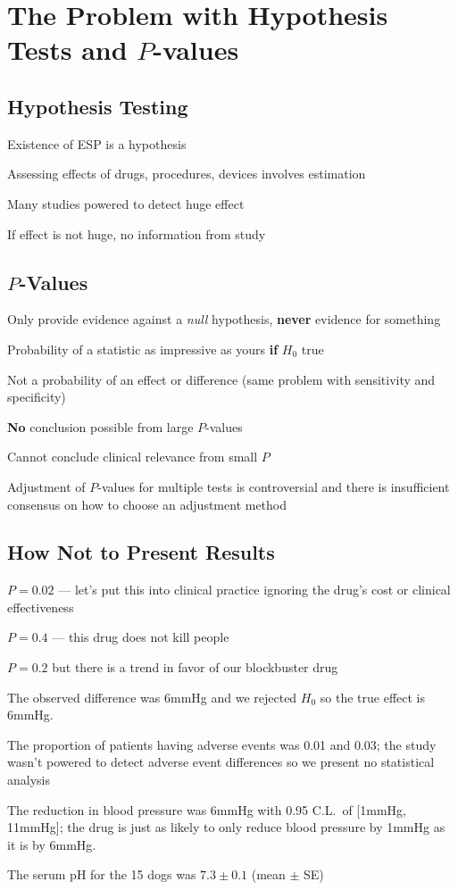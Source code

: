 \section{The Problem with Hypothesis Tests and $P$-values}
\subsection{Hypothesis Testing}
\bi
\item Existence of ESP is a hypothesis
\item Assessing effects of drugs, procedures, devices involves
  estimation
\item Many studies powered to detect huge effect
\item If effect is not huge, no information from study
\ei

\subsection{$P$-Values} 
\bi
\item Only provide evidence against a \emph{null} hypothesis,
  \textbf{never} evidence for something
\item Probability of a statistic as impressive as yours \textbf{\Large
    if} $H_0$ true
\item Not a probability of an effect or difference (same problem with
  sensitivity and specificity)
\item \textbf{No} conclusion possible from large $P$-values
\item Cannot conclude clinical relevance from small $P$
\item Adjustment of $P$-values for multiple tests is controversial and
  there is insufficient consensus on how to choose an adjustment
  method
\ei

\subsection{How Not to Present Results} 
\bi
\item $P=0.02$ --- let's put this into clinical practice ignoring the
  drug's cost or clinical effectiveness
\item $P=0.4$ --- this drug does not kill people
\item $P=0.2$ but there is a trend in favor of our blockbuster drug
\item The observed difference was 6mmHg and we rejected $H_0$ so the
  true effect is 6mmHg.
\item The proportion of patients having adverse events was 0.01 and
  0.03; the study wasn't powered to detect adverse event differences
  so we present no statistical analysis
\item The reduction in blood pressure was 6mmHg with 0.95 C.L.\ of
  [1mmHg, 11mmHg]; the drug is just as likely to only reduce blood
  pressure by 1mmHg as it is by 6mmHg.
\item The serum pH for the 15 dogs was $7.3 \pm 0.1$ (mean $\pm$ SE)
\ei

